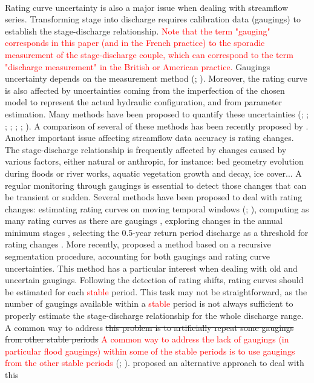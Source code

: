 \documentclass[11pt]{article}
\begin{document}
    \paragraph{}
    Rating curve uncertainty is also a major issue when dealing with streamflow series. Transforming stage into discharge requires calibration data (gaugings) to establish the stage-discharge relationship.
\textcolor{red}{Note that the term "gauging" corresponds in this paper (and in the French practice) to the sporadic measurement of the stage-discharge couple, which can correspond to the term "discharge measurement" in the British or American practice.} Gaugings uncertainty depends on the measurement method (\citet{lecoz_quantification_2014}; \citet{puechberty_charte_2017}). Moreover, the rating curve is also affected by uncertainties coming from the imperfection of the chosen model to represent the actual hydraulic configuration, and from parameter estimation. Many methods have been proposed to quantify these uncertainties (\citet{petersen-overleir_bayesian_2009}; \citet{juston_rating_2014}; \citet{le_coz_combining_2014}; \citet{morlot_dynamic_2014}; \citet{coxon_novel_2015}; \citet{mcmillan_rating_2015}; \citet{mansanarez_rapid_2019}). A comparison of several of these methods has been recently proposed by \citet{kiang_comparison_2018}. Another important issue affecting streamflow data accuracy is rating changes. The stage-discharge relationship is frequently affected by changes caused by various factors, either natural or anthropic, for instance: bed geometry evolution during floods or river works, aquatic vegetation growth and decay, ice cover... A regular monitoring through gaugings is essential to detect those changes \citep{ibbitt_gauging_1987} that can be transient or sudden. Several methods have been proposed to deal with rating changes: estimating rating curves on moving temporal windows (\citet{westerberg_stage-discharge_2011}; \citet{guerrero_temporal_2012}), computing as many rating curves as there are gaugings \citep{morlot_dynamic_2014}, exploring changes in the annual minimum stages \citep{lapuszek_methods_2015}, selecting the 0.5-year return period discharge as a threshold for rating changes \citep{mcmillan_impacts_2010}. More recently, \citet{darienzo_detection_2021} proposed a method based on a recursive segmentation procedure, accounting for both gaugings and rating curve uncertainties. This method has a particular interest when dealing with old and uncertain gaugings. Following the detection of rating shifts, rating curves should be estimated for each \textcolor{red}{stable} period. This task may not be straightforward, as the number of gaugings available within a \textcolor{red}{stable} period is not always sufficient to properly estimate the stage-discharge relationship for the whole discharge range. A common way to address \sout{this problem is to artificially repeat some gaugings from other stable periods} \textcolor{red}{A common way to address the lack of gaugings (in particular flood gaugings) within some of the stable periods is to use gaugings from the other stable periods} (\citet{mcmillan_benchmarking_2012}; \citet{puechberty_charte_2017}). \citet{mansanarez_shift_2019} proposed an alternative approach to deal with this 
\end{document}
